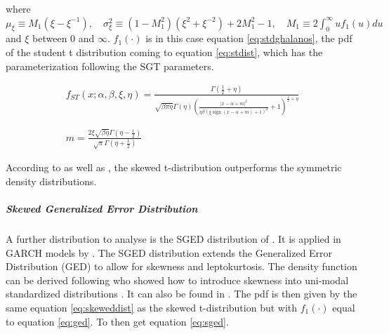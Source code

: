 \documentclass[a4paper, nobind]{templates/ociamthesis}
\begin{document}
\noindent where \(\mu_{\xi} \equiv M_{1}\left(\xi-\xi^{-1}\right), \quad \sigma_{\xi}^{2} \equiv\left(1-M_{1}^{2}\right)\left(\xi^{2}+\xi^{-2}\right)+2 M_{1}^{2}-1, \quad M_{1} \equiv 2 \int_{0}^{\infty} u f_{1}(u) d u\) and \(\xi\) between \(0\) and \(\infty\). \(f_1(\cdot)\) is in this case equation \eqref{eq:stdghalanos}, the pdf of the student t distribution coming to equation \eqref{eq:stdist}, which has the parameterization following the SGT parameters.

\begin{equation}
\begin{array}{c}f_{S T}(x ; \alpha, \beta, \xi, \eta)=\frac{\Gamma\left(\frac{1}{2}+\eta\right)}{\sqrt{\beta\pi \eta} \Gamma(\eta)\left(\frac{|x-\alpha+m|^{2}}{\eta\beta(\xi \operatorname{sign}(x-\alpha+m)+1)^{2}}+1\right)^{\frac{1}{2}+\eta}} \\ \\ \\ m=\frac{2 \xi \sqrt{\beta\eta} \Gamma\left(\eta-\frac{1}{2}\right)}{\sqrt{\pi} \Gamma\left(\eta+\frac{1}{2}\right)}\end{array}
 \label{eq:stdist}
\end{equation}

\noindent According to \textcite{giot2003} as well as \textcite{giot2004}, the skewed t-distribution outperforms the symmetric density distributions.

\hypertarget{skewed-generalized-error-distribution}{%
\subparagraph{Skewed Generalized Error Distribution}\label{skewed-generalized-error-distribution}}

\noindent A further distribution to analyse is the SGED distribution of \textcite{theodossiou2000}. It is applied in GARCH models by \textcite{lee2008}. The SGED distribution extends the Generalized Error Distribution (GED) to allow for skewness and leptokurtosis. The density function can be derived following \textcite{fernández1998} who showed how to introduce skewness into uni-modal standardized distributions \autocite{trottier2015}. It can also be found in \textcite{theodossiou2000}. The pdf is then given by the same equation \eqref{eq:skeweddist} as the skewed t-distribution but with \(f_1(\cdot)\) equal to equation \eqref{eq:ged}. To then get equation \eqref{eq:sged}.
\end{document}
